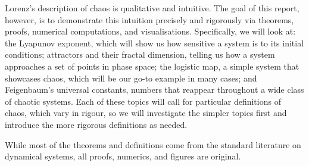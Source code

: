 Lorenz's description of chaos is qualitative and intuitive. 
The goal of this report, however, is to demonstrate this intuition precisely and rigorously via theorems, proofs, numerical computations, and visualisations.
Specifically, we will look at: the Lyapunov exponent, which will show us how sensitive a system is to its initial conditions; attractors and their fractal dimension, telling us how a system approaches a set of points in phase space; the logistic map, a simple system that showcases chaos, which will be our go-to example in many cases; and Feigenbaum's universal constants, numbers that reappear throughout a wide class of chaotic systems. 
Each of these topics will call for particular definitions of chaos, which vary in rigour, so we will investigate the simpler topics first and introduce the more rigorous definitions as needed.

While most of the theorems and definitions come from the standard literature on dynamical systems, all proofs, numerics, and figures are original.
